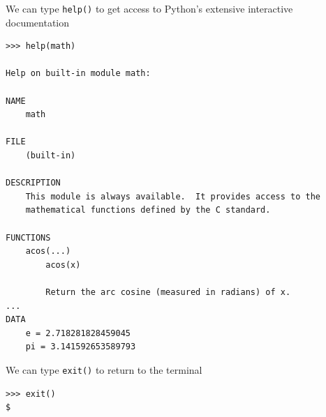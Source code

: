 \documentclass[8pt,a4paper,compress]{beamer}
\begin{document}
\begin{frame}[fragile]
\pause

We can type \lstinline{help()} to get access to Python's extensive interactive documentation

\smallskip

\begin{lstlisting}[language={},style=focusin]
>>> help(math)

Help on built-in module math:

NAME
    math

FILE
    (built-in)

DESCRIPTION
    This module is always available.  It provides access to the
    mathematical functions defined by the C standard.

FUNCTIONS
    acos(...)
        acos(x)
        
        Return the arc cosine (measured in radians) of x.
...
DATA
    e = 2.718281828459045
    pi = 3.141592653589793
\end{lstlisting}

\pause\bigskip

We can type \lstinline{exit()} to return to the terminal

\smallskip

\begin{lstlisting}[language={},style=focusin]
>>> exit()
$
\end{lstlisting}
\end{frame}
\end{document}
